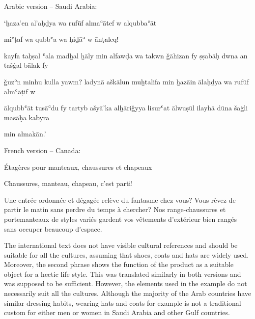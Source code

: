 \documentclass[output=paper]{langsci/langscibook}
\begin{document}
Arabic version – Saudi Arabia:

\begin{center}
  




\end{center}

\begin{center}
  ‘ẖaza’en al’aḥḏya wa rufūf almaʿātef w alqubbaʿāt

  miʿṭaf wa qubbʿa wa ḥiḏāʾ w ānṭaleq!

  kayfa taḥṣal ʿala madẖal ẖāly min alfawḍa wa takwn ǧāhizan fy ṣṣabāḥ dwna an tašġal bālak fy

  ǧuzʾn minhu kulla yawm? ladynā aškālun muẖtalifa min ẖazāin ālaḥḏya wa rufūf almʿāṭif w

  ālqubbʿāt tusāʿdu fy tartyb ašyā'ka alẖāriǧyya lisurʿat ālwuṣūl ilayhā dūna šaġli masāḥa kabyra

  min almakān.’
\end{center}

French version – Canada: 

\begin{center}
  Étagères pour manteaux, chaussures et chapeaux

  Chaussures, manteau, chapeau, c'est parti!

  Une entrée ordonnée et dégagée relève du fantasme chez vous? Vous rêvez de partir le matin sans perdre du temps à chercher? Nos range-chaussures et portemanteaux de styles variés gardent vos vêtements d'extérieur bien rangés sans occuper beaucoup d'espace.
\end{center}

The international text does not have visible cultural references and should be suitable for all the cultures, assuming that shoes, coats and hats are widely used. Moreover, the second phrase shows the function of the product as a suitable object for a hectic life style. This was translated similarly in both versions and was supposed to be sufficient. However, the elements used in the example do not necessarily suit all the cultures. Although the majority of the Arab countries have similar dressing habits, wearing hats and coats for example is not a traditional custom for either men or women in Saudi Arabia and other Gulf countries.
\end{document}

